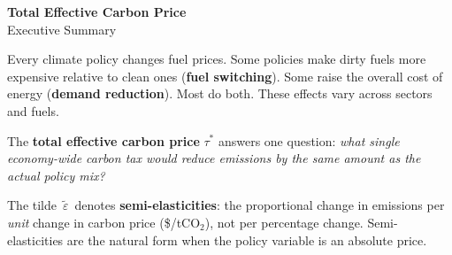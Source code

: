 \documentclass[11pt,a4paper]{article}
\begin{document}
\begin{center}
{\LARGE\bfseries Total Effective Carbon Price}\\[6pt]
{\large Executive Summary}
\end{center}

\vspace{0.8em}

Every climate policy changes fuel prices. Some policies make dirty fuels more expensive relative to clean ones (\textbf{fuel switching}). Some raise the overall cost of energy (\textbf{demand reduction}). Most do both. These effects vary across sectors and fuels.

The \textbf{total effective carbon price} $\tau^*$ answers one question: \emph{what single economy-wide carbon tax would reduce emissions by the same amount as the actual policy mix?}

\vspace{0.8em}

\begin{center}
\end{center}

\vspace{0.8em}

The tilde $\,\tilde{\varepsilon}\,$ denotes \textbf{semi-elasticities}: the proportional change in emissions per \emph{unit} change in carbon price (\$/tCO$_2$), not per percentage change. Semi-elasticities are the natural form when the policy variable is an absolute price.

\vspace{0.3em}
\end{document}
